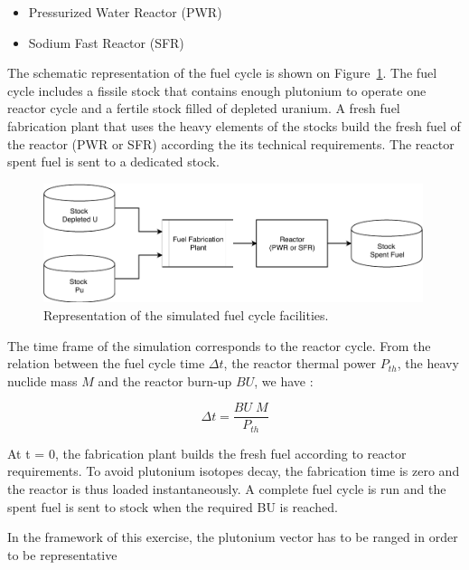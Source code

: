 \begin{itemize}
\item Pressurized Water Reactor (PWR)
\item Sodium Fast Reactor (SFR)
\end{itemize}

The schematic representation of the fuel cycle is shown on Figure~\ref{fig:FuelCycle}. The fuel cycle includes a fissile stock that contains enough plutonium to operate one reactor cycle and a fertile stock filled of depleted uranium. A fresh fuel fabrication plant that uses the heavy elements of the stocks build the fresh fuel of the reactor (PWR or SFR) according the its technical requirements. The reactor spent fuel is sent to a dedicated stock.

\begin{figure}[h]
    \begin{center}
        \includegraphics[width = 0.99\textwidth]{FIG/FuelCycleDiagram.pdf}
        \caption{Representation of the simulated fuel cycle facilities.}
        \label{fig:FuelCycle}
    \end{center}
\end{figure}

The time frame of the simulation corresponds to the reactor cycle. From the relation between the fuel cycle time $\Delta t$, the reactor thermal power $P_{th}$, the heavy nuclide mass $M$ and the reactor burn-up $BU$, we have : 

\begin{equation}
    \Delta t = \frac{BU \; M}{P_{th}}
\end{equation}

At t = 0, the fabrication plant builds the fresh fuel according to reactor requirements. To avoid plutonium isotopes decay, the fabrication time is zero and the reactor is thus loaded instantaneously. A complete fuel cycle is run and the spent fuel is sent to stock when the required BU is reached.

In the framework of this exercise, the plutonium vector has to be ranged in order to be representative 

